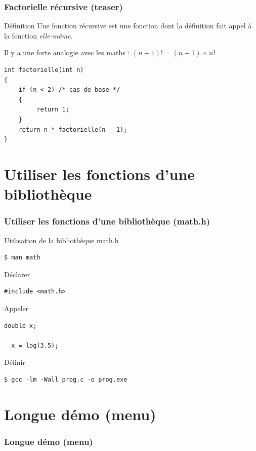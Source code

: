 \documentclass[xcolor=pdftex,svgnames,table]{beamer}
\begin{document}
\begin{frame}[fragile]
  \frametitle{Factorielle récursive (teaser)}
  \begin{block}{Définition}
    Une fonction récursive est une fonction dont la définition fait
    appel à la fonction \emph{elle-même}.
  \end{block}

\pause
Il y a une forte analogie avec les maths : $(n + 1)! = (n + 1) \times n!$

\pause
\begin{lstlisting}[escapechar={\%},basicstyle=\ttfamily\small] 
int factorielle(int n)
{
    if (n < 2) /* cas de base */
    {
         return 1;
    } 
    return n * factorielle(n - 1); 
}
\end{lstlisting}
\end{frame}

\section[math.h]{Utiliser les
  fonctions d'une bibliothèque}

\begin{frame}[fragile]
  \frametitle{Utiliser les fonctions d'une bibliothèque (math.h)}
Utilisation de la bibliothèque math.h 
\begin{verbatim}
$ man math
\end{verbatim}
  \begin{block}{Déclarer}
    \begin{lstlisting}[basicstyle=\ttfamily\small] 
#include <math.h>
     \end{lstlisting}
  \end{block}

  \begin{block}{Appeler}
  \begin{lstlisting}[basicstyle=\ttfamily\small] 
  double x;

  x = log(3.5);
    \end{lstlisting}  
  \end{block}

  \begin{block}{Définir}
\begin{verbatim}
$ gcc -lm -Wall prog.c -o prog.exe
\end{verbatim}
 \end{block}
\end{frame}


\section[Démos]{Longue démo (menu)}
\begin{frame}
  \frametitle{Longue démo (menu)}
\end{frame}
\end{document}
